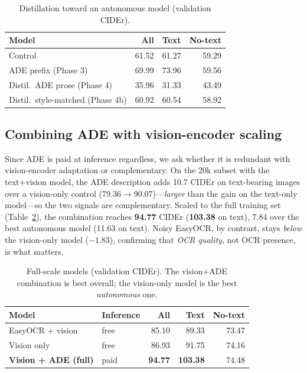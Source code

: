\begin{table}[t]
\centering
\caption{Distillation toward an autonomous model (validation CIDEr).}
\label{tab:distill}
\begin{tabular}{lrrr}
\toprule
Model & All & Text & No-text \\
\midrule
Control                           & 61.52 & 61.27 & 59.29 \\
ADE prefix (Phase 3)              & 69.99 & 73.96 & 59.56 \\
Distil.\ ADE prose (Phase 4)      & 35.96 & 31.33 & 43.49 \\
Distil.\ style-matched (Phase 4b) & 60.92 & 60.54 & 58.92 \\
\bottomrule
\end{tabular}
\end{table}

\subsection{Combining ADE with vision-encoder scaling}
\label{sec:res:full}
Since ADE is paid at inference regardless, we ask whether it is redundant with
vision-encoder adaptation or complementary. On the 20k subset with the text+vision
model, the ADE description adds \num{+10.7} CIDEr on text-bearing images over a
vision-only control (\num{79.36}$\rightarrow$\num{90.07})---\emph{larger} than the
gain on the text-only model---so the two signals are complementary. Scaled to the
full training set (Table~\ref{tab:full}), the combination reaches
\textbf{\num{94.77}} CIDEr (\textbf{\num{103.38}} on text), \num{+7.84} over the best
autonomous model (\num{+11.63} on text). Noisy EasyOCR, by contrast, stays
\emph{below} the vision-only model ($-1.83$), confirming that \emph{OCR quality},
not OCR presence, is what matters.

\begin{table}[t]
\centering
\caption{Full-scale models (validation CIDEr). The vision$+$ADE combination is best
overall; the vision-only model is the best \emph{autonomous} one.}
\label{tab:full}
\begin{tabular}{llrrr}
\toprule
Model & Inference & All & Text & No-text \\
\midrule
EasyOCR + vision          & free & 85.10 & 89.33 & 73.47 \\
Vision only               & free & 86.93 & 91.75 & 74.16 \\
\textbf{Vision + ADE (full)} & paid & \textbf{94.77} & \textbf{103.38} & 74.48 \\
\bottomrule
\end{tabular}
\end{table}

